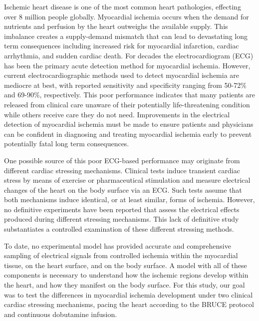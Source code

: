 \documentclass[twocolumn]{cinc}
\begin{document}
Ischemic heart disease is one of the most common heart pathologies,
effecting over 8 million people globally. \cite{Roth2015} Myocardial
ischemia occurs when the demand for nutrients and perfusion by the heart
outweighs the available supply. This imbalance creates a supply-demand
mismatch that can lead to devastating long term consequences including
increased risk for myocardial infarction, cardiac arrhythmia, and sudden
cardiac death.\cite{Roth2015} For decades the electrocardiogram (ECG) has
been the primary acute detection method for myocardial
ischemia. \cite{McCarthy1990} However, current electrocardiographic
methods used to detect myocardial ischemia are mediocre at best, with
reported sensitivity and specificity ranging from 50-72\% and 69-90\%,
respectively. \cite{Akkerhuis2011} This poor performance indicates
that many patients are released from clinical care unaware of their
potentially life-threatening condition while others receive care they do
not need. Improvements in the electrical detection of myocardial ischemia
must be made to ensure patients and physicians can be confident in
diagnosing and treating myocardial ischemia early to prevent potentially
fatal long term consequences.

One possible source of this poor ECG-based performance may originate
from different cardiac stressing mechanisms. Clinical tests induce
transient cardiac stress by means of exercise or pharmaceutical stimulation
and measure electrical changes of the heart on the body surface via an
ECG. Such tests assume that both mechanisms induce identical, or at least
similar, forms of ischemia. However, no definitive experiments have been
reported that assess the electrical effects produced during
different stressing mechanisms. This lack of definitive study 
substantiates a controlled examination of these different stressing methods.

To date, no experimental model has provided accurate and comprehensive sampling of
electrical signals from controlled ischemia within the myocardial
tissue, on the heart surface, and on the body surface. A model with all of these
components is necessary to understand how the ischemic regions develop
within the heart, and how they manifest on the body surface. For this
study, our goal was to test the differences in myocardial ischemia
development under two
clinical cardiac stressing mechanisms, pacing the heart according to the BRUCE protocol and continuous
dobutamine infusion.


%
\end{document}
